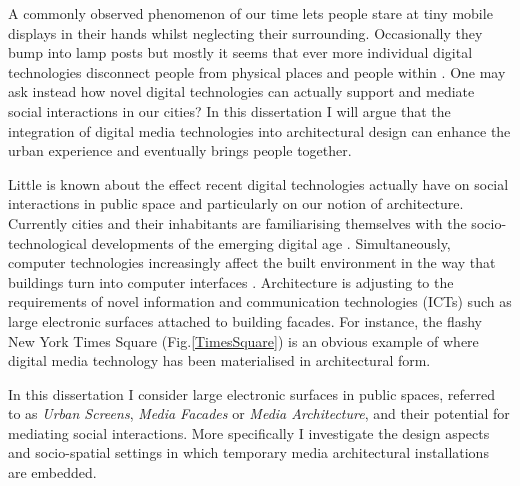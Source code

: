 A commonly observed phenomenon of our time lets people stare at tiny mobile displays in their hands whilst neglecting their surrounding. Occasionally they bump into lamp posts but mostly it seems that ever more individual digital technologies disconnect people from physical places and people within \cite{Turkle_2012}. One may ask instead how novel digital technologies can actually support and mediate social interactions in our cities?    
In this dissertation I will argue that the integration of digital media technologies into architectural design can enhance the urban experience and eventually brings people together. 

Little is known about the effect recent digital technologies actually have on social interactions in public space and particularly on our notion of architecture. 
Currently cities and their inhabitants are familiarising themselves with the socio-technological developments of the emerging digital age \cite{Hemment_2013}. 
Simultaneously, computer technologies increasingly affect the built environment in the way that buildings turn into computer interfaces \cite{Mitchell_1995}.
Architecture is adjusting to the requirements of novel information and communication technologies (ICTs) such as large electronic surfaces attached to building facades. For instance, the flashy New York Times Square (Fig.\ref{TimesSquare}) is an obvious example of where digital media technology has been materialised in architectural form. 

In this dissertation I consider large electronic surfaces in public spaces, referred to as \textit{Urban Screens}, \textit{Media Facades} or \textit{Media Architecture}, and their potential for mediating social interactions. More specifically I investigate the design aspects and socio-spatial settings in which temporary media architectural installations are embedded. 

